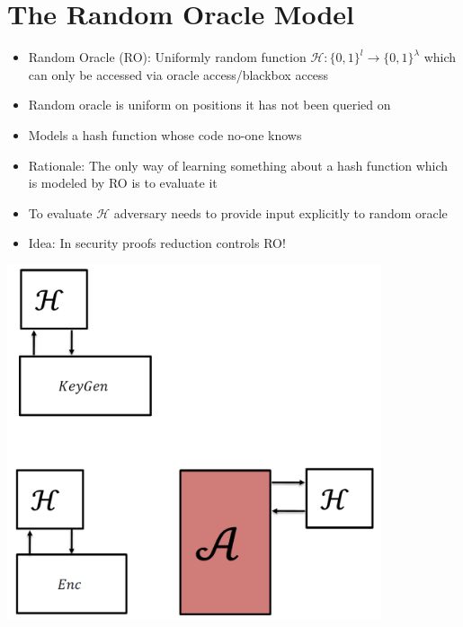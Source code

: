 \section{The Random Oracle Model}
	\begin{itemize}
	    \item Random Oracle (RO): Uniformly random function $\mathcal{H}: \{0,1\}^l \to \{0,1\}^{\lambda}$ which can only be accessed via oracle access/blackbox access
	    \item Random oracle is uniform on positions it has not been queried on
	    \item Models a hash function whose code no-one knows
	    \item Rationale: The only way of learning something about a hash function which is modeled by RO is to evaluate it
	    \item To evaluate $\mathcal{H}$ adversary needs to provide input explicitly to random oracle
	    \item Idea: In security proofs reduction controls RO!
	\end{itemize}
   	\begin{center}
		\includegraphics[width=110mm]{Graphics/Hash Functions/hf3.png}
	\end{center}
